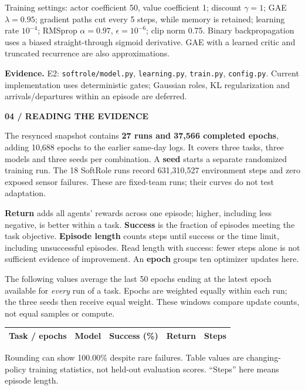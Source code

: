 \documentclass[11pt,letterpaper]{article}
\newcommand{\eyebrow}[1]{{\small\bfseries\color{teal}#1}\par\vspace{3pt}}
\newcommand{\pagetitle}[2]{\eyebrow{#1}{\fontsize{25}{28}\selectfont\bfseries #2\par}\vspace{7pt}}
\newcommand{\sub}[1]{\par\vspace{5pt}{\large\bfseries #1}\par\vspace{1pt}}
\newcommand{\evidence}[1]{\vfill{\fontsize{8.4}{10.5}\selectfont\color{muted}\textbf{Evidence.} #1\par}}
\newcommand{\captiontext}[1]{\par{\fontsize{9}{11}\selectfont\color{muted}#1\par}}
\newcommand{\code}[1]{\nolinkurl{#1}}
\begin{document}
\captiontext{Training settings: actor coefficient 50, value coefficient 1; discount $\gamma=1$; GAE $\lambda=0.95$; gradient paths cut every 5 steps, while memory is retained; learning rate $10^{-4}$; RMSprop $\alpha=0.97$, $\epsilon=10^{-6}$; clip norm 0.75. Binary backpropagation uses a biased straight-through sigmoid derivative. GAE with a learned critic and truncated recurrence are also approximations.}
\evidence{E2: \code{softrole/model.py}, \code{learning.py}, \code{train.py}, \code{config.py}. Current implementation uses deterministic gates; Gaussian roles, KL regularization and arrivals/departures within an episode are deferred.}
\endgroup

\newpage
\pagetitle{04 / READING THE EVIDENCE}{What the comparison can tell us}
The resynced snapshot contains \textbf{27 runs and 37,566 completed epochs}, adding 10,688 epochs to the earlier same-day logs. It covers three tasks, three models and three seeds per combination. A \textbf{seed} starts a separate randomized training run. The 18 SoftRole runs record 631,310,527 environment steps and zero exposed sensor failures. These are fixed-team runs; their curves do not test adaptation.

\textbf{Return} adds all agents' rewards across one episode; higher, including less negative, is better within a task. \textbf{Success} is the fraction of episodes meeting the task objective. \textbf{Episode length} counts steps until success or the time limit, including unsuccessful episodes. Read length with success: fewer steps alone is not sufficient evidence of improvement. An \textbf{epoch} groups ten optimizer updates here.

\sub{A contextual comparison at the same epoch window}
The following values average the last 50 epochs ending at the latest epoch available for \emph{every} run of a task. Epochs are weighted equally within each run; the three seeds then receive equal weight. These windows compare update counts, not equal samples or compute.
\par{\small\renewcommand{\arraystretch}{1.12}\begin{tabularx}{\linewidth}{@{}p{1.23in}Xrrr@{}}\toprule
Task / epochs & Model & Success (\%) & Return & Steps \\\midrule
\bottomrule
\end{tabularx}}
\captiontext{Rounding can show 100.00\% despite rare failures. Table values are changing-policy training statistics, not held-out evaluation scores. ``Steps'' here means episode length.}
\end{document}

